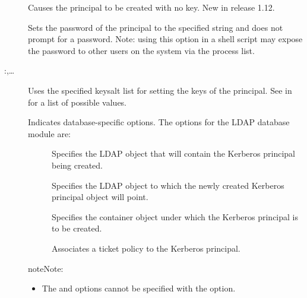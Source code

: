 \documentclass[letterpaper,10pt,english]{sphinxmanual}
\begin{document}
\begin{description}
\item[{}] \leavevmode
Causes the principal to be created with no key.  New in release
1.12.

\item[{ }] \leavevmode
Sets the password of the principal to the specified string and
does not prompt for a password.  Note: using this option in a
shell script may expose the password to other users on the system
via the process list.

\item[{ :,…}] \leavevmode
Uses the specified keysalt list for setting the keys of the
principal.  See {\hyperref[\detokenize{admin/conf_files/kdc_conf:keysalt-lists}]{}} in {\hyperref[\detokenize{admin/conf_files/kdc_conf:kdc-conf-5}]{}} for a
list of possible values.

\item[{ }] \leavevmode
Indicates database-specific options.  The options for the LDAP
database module are:
\begin{description}
\item[{}] \leavevmode
Specifies the LDAP object that will contain the Kerberos
principal being created.

\item[{}] \leavevmode
Specifies the LDAP object to which the newly created Kerberos
principal object will point.

\item[{}] \leavevmode
Specifies the container object under which the Kerberos
principal is to be created.

\item[{}] \leavevmode
Associates a ticket policy to the Kerberos principal.

\end{description}

\begin{sphinxadmonition}{note}{Note:}\begin{itemize}
\item {} 
The  and  options cannot be
specified with the  option.


\end{itemize}
\end{sphinxadmonition}
\end{description}
\end{document}
